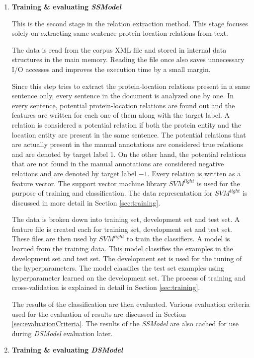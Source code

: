 \begin{enumerate}
\item \textbf{Training \& evaluating \textit{SSModel}}

This is the second stage in the relation extraction method. This stage focuses solely on extracting same-sentence protein-location relations from text.

The data is read from the corpus XML file and stored in internal data structures in the main memory. Reading the file once also saves unnecessary I/O accesses and improves the execution time by a small margin.

Since this step tries to extract the protein-location relations present in a same sentence only, every sentence in the document is analyzed one by one. In every sentence, potential protein-location relations are found out and the features are written for each one of them along with the target label. A relation is considered a potential relation if both the protein entity and the location entity are present in the same sentence. The potential relations that are actually present in the manual annotations are considered true relations and are denoted by target label $1$. On the other hand, the potential relations that are not found in the manual annotations are considered negative relations and are denoted by target label $-1$. Every relation is written as a feature vector. The support vector machine library $SVM^{light}$ \cite{joachims1999making} is used for the purpose of training and classification.  The data representation for $SVM^{light}$ is discussed in more detail in Section \ref{sec:training}.

The data is broken down into training set, development set and test set. A feature file is created each for training set, development set and test set. These files are then used by $SVM^{light}$ to train the classifiers. A model is learned from the training data. This model classifies the examples in the development set and test set. The development set is used for the tuning of the hyperparameters. The model classifies the test set examples using hyperparameter learned on the development set. The process of training and cross-validation is explained in detail in Section \ref{sec:training}.

The results of the classification are then evaluated. Various evaluation criteria used for the evaluation of results are discussed in Section \ref{sec:evaluationCriteria}. The results of the \textit{SSModel} are also cached for use during \textit{DSModel} evaluation later.

\item \textbf{Training \& evaluating \textit{DSModel}}


\end{enumerate}
